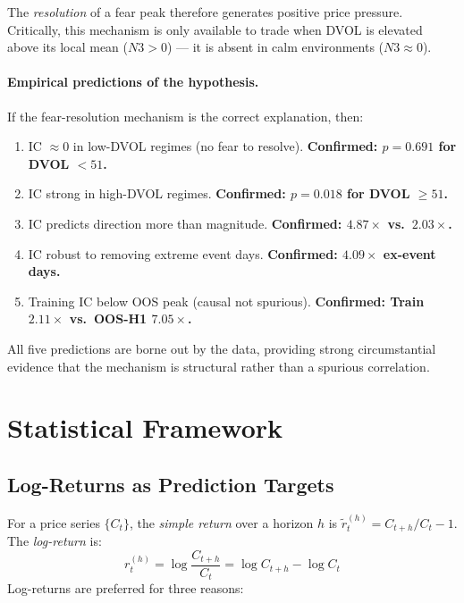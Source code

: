 \documentclass[12pt, a4paper]{article}
\theoremstyle{plain}
\theoremstyle{definition}
\begin{document}
The \emph{resolution} of a fear peak therefore generates positive price
pressure. Critically, this mechanism is only available to trade when DVOL is
elevated above its local mean ($N3 > 0$) --- it is absent in calm environments
($N3 \approx 0$).

\paragraph{Empirical predictions of the hypothesis.}
If the fear-resolution mechanism is the correct explanation, then:

\begin{enumerate}[label=(\alph*)]
  \item IC $\approx 0$ in low-DVOL regimes (no fear to resolve). \quad \textbf{Confirmed: $p = 0.691$ for DVOL $< 51$.}
  \item IC strong in high-DVOL regimes. \quad \textbf{Confirmed: $p = 0.018$ for DVOL $\geq 51$.}
  \item IC predicts direction more than magnitude. \quad \textbf{Confirmed: $4.87\times$ vs.\ $2.03\times$.}
  \item IC robust to removing extreme event days. \quad \textbf{Confirmed: $4.09\times$ ex-event days.}
  \item Training IC below OOS peak (causal not spurious). \quad \textbf{Confirmed: Train $2.11\times$ vs.\ OOS-H1 $7.05\times$.}
\end{enumerate}

All five predictions are borne out by the data, providing strong circumstantial
evidence that the mechanism is structural rather than a spurious correlation.


\section{Statistical Framework}
\label{sec:stats}

\subsection{Log-Returns as Prediction Targets}

For a price series $\{C_t\}$, the \emph{simple return} over a horizon $h$ is
$\tilde{r}_t^{(h)} = C_{t+h}/C_t - 1$. The \emph{log-return} is:
\[
  r_t^{(h)} = \log\frac{C_{t+h}}{C_t} = \log C_{t+h} - \log C_t
\]
Log-returns are preferred for three reasons:
\end{document}
